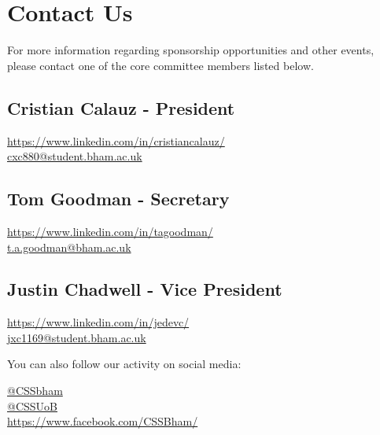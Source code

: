 \documentclass{article}
\begin{document}
\fontsize{13}{14}\selectfont

\section*{Contact Us}

For more information regarding sponsorship opportunities and other events, 
please contact one of the core committee members listed below.

\subsection*{Cristian Calauz - President}

\faLinkedin \hspace{0.1cm} \url{https://www.linkedin.com/in/cristiancalauz/} \\
\faEnvelope \hspace{0.1cm} \href{mailto:cxc880@student.bham.ac.uk}{cxc880@student.bham.ac.uk}

\subsection*{Tom Goodman - Secretary}

\faLinkedin \hspace{0.1cm} \url{https://www.linkedin.com/in/tagoodman/} \\
\faEnvelope \hspace{0.1cm} \href{mailto:t.a.goodman@bham.ac.uk}{t.a.goodman@bham.ac.uk}

\subsection*{Justin Chadwell - Vice President}

\faLinkedin \hspace{0.1cm} \url{https://www.linkedin.com/in/jedevc/} \\
\faEnvelope \hspace{0.1cm} \href{mailto:jxc1169@student.bham.ac.uk}{jxc1169@student.bham.ac.uk}

\vspace{1cm}

\noindent You can also follow our activity on social media:

\noindent \faTwitter  \hspace{0.1cm} \href{https://twitter.com/cssbham}{@CSSbham} \\
\faInstagram  \hspace{0.1cm} \href{https://facebook.com/groups/CSSUoB/}{@CSSUoB} \\
\faFacebook  \hspace{0.3cm} \url{https://www.facebook.com/CSSBham/}
\end{document}
